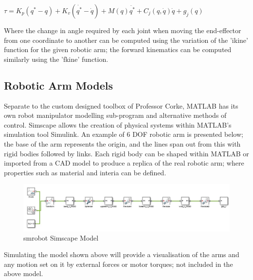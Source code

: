 \documentclass[12pt,openany,a4paper]{book}
\begin{document}
$\tau = K_p (q^{*} - q) + K_v (\dot{q^{*}} - \dot{q}) + M(q) \ddot{q^{*}} + C_j (q, \dot{q}) \dot{q} + g_j (q)$

Where the change in angle required by each joint when moving the end-effector from one coordinate to another can be computed using the variation of the 'ikine' function for the given robotic arm; the forward kinematics can be computed similarly using the 'fkine' function.

\subsection{Robotic Arm Models}
Separate to the custom designed toolbox of Professor Corke, MATLAB has its own robot manipulator modelling sub-program and alternative methods of control. Simscape allows the creation of physical systems within MATLAB's simulation tool Simulink. An example of 6 DOF robotic arm is presented below; the base of the arm represents the origin, and the lines span out from this with rigid bodies followed by links. Each rigid body can be shaped within MATLAB or imported from a CAD model to produce a replica of the real robotic arm; where properties such as material and interia can be defined.

\begin{center}
\begin{figure}[htb]
  \includegraphics[width=\linewidth]{simscape_robotic_arm.jpg}
\caption{smrobot Simscape Model}
\end{figure}
\end{center}

Simulating the model shown above will provide a visualisation of the arms and any motion set on it by external forces or motor torques; not included in the above model.
\end{document}
